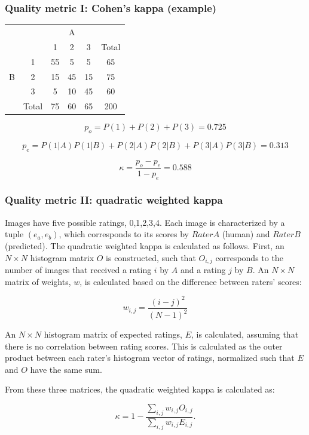 \begin{frame}\frametitle{Quality metric I: Cohen's kappa (example)}
\footnotesize
\begin{table}[]
\centering
\begin{tabular}{c|c|c|c|c|c}
\cline{3-5}
\multicolumn{2}{c|}{\multirow{2}{*}{}}           & \multicolumn{3}{c|}{A} &                            \\ \cline{3-6} 
\multicolumn{2}{c|}{}                            & 1      & 2     & 3     & \multicolumn{1}{c|}{Total} \\ \hline
\multicolumn{1}{|c|}{\multirow{3}{*}{B}} & 1     & 55     & 5     & 5     & \multicolumn{1}{c|}{65}    \\ \cline{2-6} 
\multicolumn{1}{|c|}{}                   & 2     & 15     & 45    & 15    & \multicolumn{1}{c|}{75}    \\ \cline{2-6} 
\multicolumn{1}{|c|}{}                   & 3     & 5      & 10    & 45    & \multicolumn{1}{c|}{60}    \\ \hline
                                         & Total & 75     & 60    & 65    & \multicolumn{1}{c|}{200}   \\ \cline{2-6} 
\end{tabular}
\end{table}

\par \[ p_o = P(1)+P(2)+P(3) = 0.725 \]
\par \[ p_e = P(1|A)P(1|B)+P(2|A)P(2|B)+P(3|A)P(3|B) = 0.313 \]
\par \[ \kappa = \frac{p_o - p_e}{1 - p_e} = 0.588 \]

\end{frame}



\begin{frame}\frametitle{Quality metric II: quadratic weighted kappa} 

\footnotesize { %
Images have five possible ratings, 0,1,2,3,4.  Each image is characterized by a tuple $ (e_a,e_b) $, which corresponds to its scores by $Rater A$ (human) and $Rater B$ (predicted).  The quadratic weighted kappa is calculated as follows. First, an $N\times N$ histogram matrix $O$ is constructed, such that $O_{i,j}$ corresponds to the number of images that received a rating $i$ by $A$ and a rating $j$ by $B$. An $N\times N$ matrix of weights, $w$, is calculated based on the difference between raters' scores:

\[ w_{i,j} = \frac{\left(i-j\right)^2}{\left(N-1\right)^2} \]

An $N\times N$ histogram matrix of expected ratings, $E$, is calculated, assuming that there is no correlation between rating scores.  This is calculated as the outer product between each rater's histogram vector of ratings, normalized such that $E$ and $O$ have the same sum.

From these three matrices, the quadratic weighted kappa is calculated as: 

\[ \kappa=1-\frac{\sum_{i,j}w_{i,j}O_{i,j}}{\sum_{i,j}w_{i,j}E_{i,j}}. \]
}

\end{frame}

